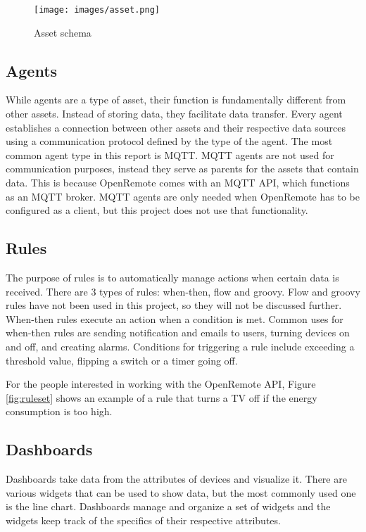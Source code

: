 \begin{figure}[ht]
    \centering
    \texttt{[image: images/asset.png]}
    \caption{Asset schema}
    \label{fig:asset}
\end{figure}

\subsection{Agents}\label{agents}
While agents are a type of asset, their function is fundamentally different from other assets. Instead of storing data, they facilitate data transfer. Every agent establishes a connection between other assets and their respective data sources using a communication protocol defined by the type of the agent. The most common agent type in this report is MQTT. MQTT agents are not used for communication purposes, instead they serve as parents for the assets that contain data. This is because OpenRemote comes with an MQTT API, which functions as an MQTT broker. MQTT agents are only needed when OpenRemote has to be configured as a client, but this project does not use that functionality.

\subsection{Rules}\label{rules}
The purpose of rules is to automatically manage actions when certain data is received. There are 3 types of rules: when-then, flow and groovy. Flow and groovy rules have not been used in this project, so they will not be discussed further. When-then rules execute an action when a condition is met. Common uses for when-then rules are sending notification and emails to users, turning devices on and off, and creating alarms. Conditions for triggering a rule include exceeding a threshold value, flipping a switch or a timer going off.

For the people interested in working with the OpenRemote API, Figure \ref{fig:ruleset} shows an example of a rule that turns a TV off if the energy consumption is too high. 

\subsection{Dashboards}\label{dashboard}
Dashboards take data from the attributes of devices and visualize it. There are various widgets that can be used to show data, but the most commonly used one is the line chart. Dashboards manage and organize a set of widgets and the widgets keep track of the specifics of their respective attributes. 

